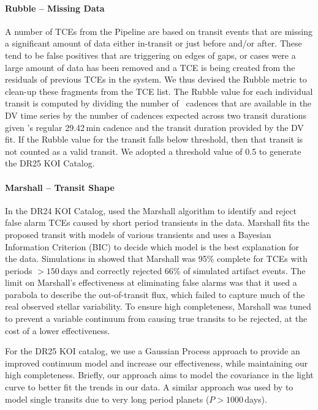 \paragraph{Rubble -- Missing Data}
\label{s:rubble}
A number of TCEs from the \kepler{} Pipeline are based on transit events that are missing a significant amount of data either in-transit or just before and/or after. These tend to be false positives that are triggering on edges of gaps, or cases were a large amount of data has been removed and a TCE is being created from the residuals of previous TCEs in the system. We thus devised the Rubble metric to clean-up these fragments from the TCE list. The Rubble value for each individual transit is computed by dividing the number of \Kepler\ cadences that are available in the DV time series by the number of cadences expected across two transit durations given \Kepler's regular 29.42\,min cadence and the transit duration provided by the DV fit. If the Rubble value for the transit falls below threshold, then that transit is not counted as a valid transit. We adopted a threshold value of 0.5 to generate the DR25 KOI Catalog.


\paragraph{Marshall -- Transit Shape}
\label{s:marshall}
In the DR24 KOI Catalog, \citet{Coughlin2016} used the Marshall algorithm \citep{Mullally2016} to identify and reject false alarm TCEs caused by short period transients in the data. Marshall fits the proposed transit with models of various transients and uses a Bayesian Information Criterion (BIC) to decide which model is the best explanation for the data. Simulations in \citet{Mullally2016} showed that Marshall was 95\% complete for TCEs with periods $>150$\,days and correctly rejected 66\% of simulated artifact events. The limit on Marshall's effectiveness at eliminating false alarms was that it used a parabola to describe the out-of-transit flux, which failed to capture much of the real observed stellar variability. To ensure high completeness, Marshall was tuned to prevent a variable continuum from causing true transits to be rejected, at the cost of a lower effectiveness.

For the DR25 KOI catalog, we use a Gaussian Process approach \citep[GP,][]{Rasmussen10} to provide an improved continuum model and increase our effectiveness, while maintaining our high completeness. Briefly, our approach aims to model the covariance in the light curve to better fit the trends in our data.
A similar approach was used by \citet{ForemanMackey16} to model single transits due to very long period planets ($P > 1000$\,days).

